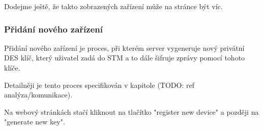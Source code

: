 Dodejme ještě, že takto zobrazených zařízení může na stránce být víc.

\subsubsection{Přidání nového zařízení}
Přidání nového zařízení je proces, při kterém server vygeneruje nový privátní DES klíč, který uživatel
zadá do STM a to dále šifruje zprávy pomocí tohoto klíče.

Detailněji je tento proces specifikován v kapitole (TODO: ref analýza/komunikace).

Na webový stránkách stačí kliknout na tlačítko "register new device" a později na "generate new key".


